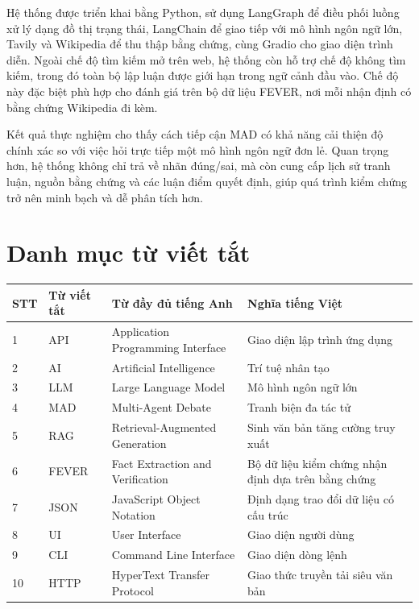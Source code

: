 ﻿\documentclass[oneside,a4paper,12pt]{extreport}
\begin{document}
Hệ thống được triển khai bằng Python, sử dụng LangGraph để điều phối luồng xử lý dạng đồ thị trạng thái, LangChain để giao tiếp với mô hình ngôn ngữ lớn, Tavily và Wikipedia để thu thập bằng chứng, cùng Gradio cho giao diện trình diễn. Ngoài chế độ tìm kiếm mở trên web, hệ thống còn hỗ trợ chế độ không tìm kiếm, trong đó toàn bộ lập luận được giới hạn trong ngữ cảnh đầu vào. Chế độ này đặc biệt phù hợp cho đánh giá trên bộ dữ liệu FEVER, nơi mỗi nhận định có bằng chứng Wikipedia đi kèm.

Kết quả thực nghiệm cho thấy cách tiếp cận MAD có khả năng cải thiện độ chính xác so với việc hỏi trực tiếp một mô hình ngôn ngữ đơn lẻ. Quan trọng hơn, hệ thống không chỉ trả về nhãn đúng/sai, mà còn cung cấp lịch sử tranh luận, nguồn bằng chứng và các luận điểm quyết định, giúp quá trình kiểm chứng trở nên minh bạch và dễ phân tích hơn.

\tableofcontents
\listoffigures
\listoftables
\newpage

\chapter*{Danh mục từ viết tắt}

\begin{longtable}{|p{1.2cm}|p{2.8cm}|p{4.6cm}|p{5.2cm}|}
\hline
\textbf{STT} & \textbf{Từ viết tắt} & \textbf{Từ đầy đủ tiếng Anh} & \textbf{Nghĩa tiếng Việt} \\
\hline
1 & API & Application Programming Interface & Giao diện lập trình ứng dụng \\
\hline
2 & AI & Artificial Intelligence & Trí tuệ nhân tạo \\
\hline
3 & LLM & Large Language Model & Mô hình ngôn ngữ lớn \\
\hline
4 & MAD & Multi-Agent Debate & Tranh biện đa tác tử \\
\hline
5 & RAG & Retrieval-Augmented Generation & Sinh văn bản tăng cường truy xuất \\
\hline
6 & FEVER & Fact Extraction and Verification & Bộ dữ liệu kiểm chứng nhận định dựa trên bằng chứng \\
\hline
7 & JSON & JavaScript Object Notation & Định dạng trao đổi dữ liệu có cấu trúc \\
\hline
8 & UI & User Interface & Giao diện người dùng \\
\hline
9 & CLI & Command Line Interface & Giao diện dòng lệnh \\
\hline
10 & HTTP & HyperText Transfer Protocol & Giao thức truyền tải siêu văn bản \\
\hline
\end{longtable}
\end{document}

